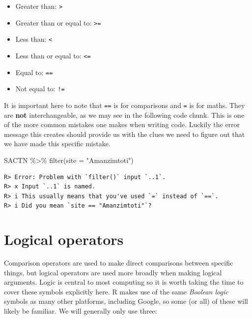\documentclass[
]{book}
\newenvironment{Shaded}{\begin{snugshade}}{\end{snugshade}}
\newcommand{\AttributeTok}[1]{\textcolor[rgb]{0.77,0.63,0.00}{#1}}
\newcommand{\FunctionTok}[1]{\textcolor[rgb]{0.00,0.00,0.00}{#1}}
\newcommand{\NormalTok}[1]{#1}
\newcommand{\SpecialCharTok}[1]{\textcolor[rgb]{0.00,0.00,0.00}{#1}}
\newcommand{\StringTok}[1]{\textcolor[rgb]{0.31,0.60,0.02}{#1}}
\providecommand{\tightlist}{%
  \setlength{\itemsep}{0pt}\setlength{\parskip}{0pt}}
\begin{document}
\begin{itemize}
\tightlist
\item
  Greater than: \texttt{\textgreater{}}\\
\item
  Greater than or equal to: \texttt{\textgreater{}=}\\
\item
  Less than: \texttt{\textless{}}\\
\item
  Less than or equal to: \texttt{\textless{}=}\\
\item
  Equal to: \texttt{==}\\
\item
  Not equal to: \texttt{!=}
\end{itemize}

It is important here to note that \texttt{==} is for comparisons and \texttt{=} is for maths. They are \textbf{not} interchangeable, as we may see in the following code chunk. This is one of the more common mistakes one makes when writing code. Luckily the error message this creates should provide us with the clues we need to figure out that we have made this specific mistake.

\begin{Shaded}
\begin{Highlighting}[]
\NormalTok{SACTN }\SpecialCharTok{\%\textgreater{}\%} 
  \FunctionTok{filter}\NormalTok{(}\AttributeTok{site =} \StringTok{"Amanzimtoti"}\NormalTok{)}
\end{Highlighting}
\end{Shaded}

\begin{verbatim}
R> Error: Problem with `filter()` input `..1`.
R> x Input `..1` is named.
R> i This usually means that you've used `=` instead of `==`.
R> i Did you mean `site == "Amanzimtoti"`?
\end{verbatim}

\hypertarget{logical-operators}{%
\section{Logical operators}\label{logical-operators}}

Comparison operators are used to make direct comparisons between specific things, but logical operators are used more broadly when making logical arguments. Logic is central to most computing so it is worth taking the time to cover these symbols explicitly here. R makes use of the same \emph{Boolean logic} symbols as many other platforms, including Google, so some (or all) of these will likely be familiar. We will generally only use three:
\end{document}
